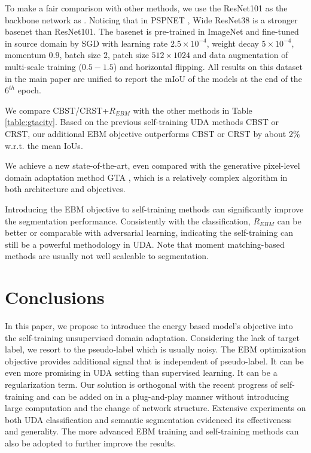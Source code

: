 \documentclass[a4paper,conference]{IEEEtran}
\theoremstyle{plain}%
\begin{document}
To make a fair comparison with other methods, we use the ResNet101 as the backbone network as \cite{Zou_2018_ECCV,zou2019confidence}. Noticing that in PSPNET \cite{zhao2017pyramid}, Wide ResNet38 is a stronger basenet than ResNet101. The basenet is pre-trained in ImageNet and fine-tuned in source domain by SGD with learning rate $2.5\times10^{-4}$, weight decay $5\times10^{-4}$, momentum $0.9$, batch size $2$, patch size $512\times1024$ and data augmentation of multi-scale training ($0.5 - 1.5$) and horizontal flipping. All results on this dataset in the main paper are unified to report the mIoU of the models at the end of the $6^{th}$ epoch. 


We compare CBST/CRST+$R_{EBM}$ with the other methods in Table \ref{table:gtacity}. Based on the previous self-training UDA methods CBST or CRST, our additional EBM objective outperforms CBST or CRST by about 2\% w.r.t. the mean IoUs. 

We achieve a new state-of-the-art, even compared with the generative pixel-level domain adaptation method GTA \cite{zhang2018fully}, which is a relatively complex algorithm in both architecture and objectives. %


Introducing the EBM objective to self-training methods can significantly improve the segmentation performance. Consistently with the classification, $R_{EBM}$ can be better or comparable with adversarial learning, indicating the self-training can still be a powerful methodology in UDA. Note that moment matching-based methods are usually not well scaleable to segmentation.



\section{Conclusions}




In this paper, we propose to introduce the energy based model's objective into the self-training unsupervised domain adaptation. Considering the lack of target label, we resort to the pseudo-label which is usually noisy. The EBM optimization objective provides additional signal that is independent of pseudo-label. It can be even more promising in UDA setting than supervised learning. It can be a regularization term. Our solution is orthogonal with the recent progress of self-training and can be added on in a plug-and-play manner without introducing large computation and the change of network structure. Extensive experiments on both UDA classification and semantic segmentation evidenced its effectiveness and generality. The more advanced EBM training and self-training methods \cite{han2019unsupervised} can also be adopted to further improve the results.
\end{document}
